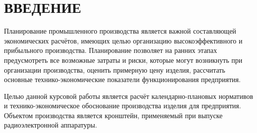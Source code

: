 \section*{ВВЕДЕНИЕ}

Планирование промышленного производства является важной составляющей 
экономических расчётов, имеющих целью организацию высокоэффективного 
и прибыльного производства.
Планирование позволяет на ранних этапах предусмотреть все возможные затраты и
риски, которые могут возникнуть при организации производства,
оценить примерную цену изделия,
рассчитать основные технико-экономические показатели функционирования предприятия.

Целью данной курсовой работы является расчёт календарно-плановых нормативов
и технико-экономическое обоснование производства изделия для предприятия.
Объектом производства является кронштейн, применяемый при выпуске
радиоэлектронной аппаратуры.
